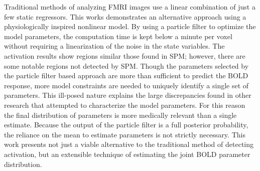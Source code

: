 \documentclass[12pt]{report}
\numberwithin{algorithm}{chapter}
\begin{document}
Traditional methods of analyzing FMRI images use a linear combination of
just a few static regressors. This works demonstrates an alternative
approach using a physiologically inspired nonlinear model. By using a 
particle filter to optimize the model parameters, the computation time
is kept below a minute per voxel without requiring a linearization 
of the noise in the state
variables. The activation results show regions similar those found in 
SPM; however, there are some notable regions not detected by 
SPM. Though the parameters selected by the particle filter based approach
are more than sufficient to predict the BOLD response,
more model constraints are needed to uniquely identify a single set
of parameters. This ill-posed nature explains the large discrepancies
found in other research that attempted to characterize the model parameters.
For this reason the final distribution of parameters is more medically relevant
than a single estimate. Because the output of the particle filter is 
a full posterior probability, the reliance on the mean to estimate 
parameters is not strictly necessary. This work presents
not just a viable alternative to the traditional method of detecting
activation, but an extensible technique of estimating the joint BOLD
parameter distribution.

\vfill



\pagebreak


\tableofcontents
\pagebreak

\listoffigures
\pagebreak

\listoftables
\pagebreak

\pagestyle{myheadings}











%
%
%

\end{document}
